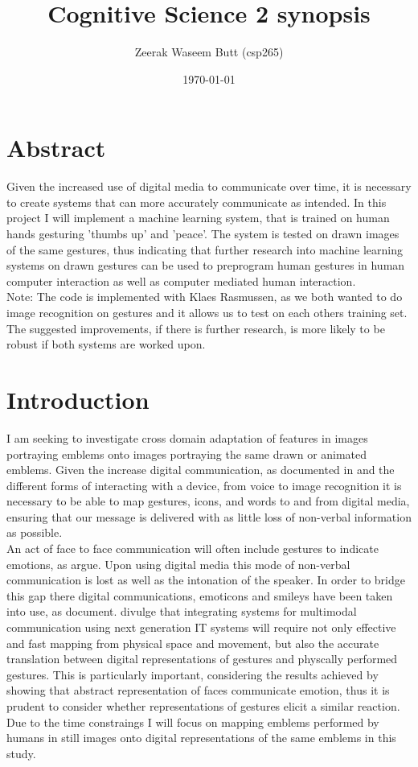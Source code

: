\documentclass[10pt, a4paper]{article}
\begin{document}
\title{Cognitive Science 2 synopsis}
\author{Zeerak Waseem Butt (csp265)}
\date{\today}
\maketitle
\section{Abstract}
Given the increased use of digital media to communicate over time, it is necessary to create systems that can more accurately communicate as intended. In this project I will implement a machine learning system, that is trained on human hands gesturing 'thumbs up' and 'peace'. The system is tested on drawn images of the same gestures, thus indicating that further research into machine learning systems on drawn gestures can be used to preprogram human gestures in human computer interaction as well as computer mediated human interaction.\\

Note: The code is implemented with Klaes Rasmussen, as we both wanted to do image recognition on gestures and it allows us to test on each others training set. The suggested improvements, if there is further research, is more likely to be robust if both systems are worked upon.
\section{Introduction}
I am seeking to investigate cross domain adaptation of features in images portraying emblems onto images portraying the same drawn or animated emblems. Given the increase digital communication, as documented in  and the different forms of interacting with a device, from voice to image recognition it is necessary to be able to map gestures, icons, and words to and from digital media, ensuring that our message is delivered with as little loss of non-verbal information as possible.\\
An act of face to face communication will often include gestures to indicate emotions, as  argue. Upon using digital media this mode of non-verbal communication is lost as well as the intonation of the speaker. In order to bridge this gap there digital communications, emoticons and smileys have been taken into use, as  document.  divulge that integrating systems for multimodal communication using next generation IT systems will require not only effective and fast mapping from physical space and movement, but also the accurate translation between digital representations of gestures and physcally performed gestures. This is particularly important, considering the results achieved by  showing that abstract representation of faces communicate emotion, thus it is prudent to consider whether representations of gestures elicit a similar reaction.\\
Due to the time constraings I will focus on mapping emblems performed by humans in still images onto digital representations of the same emblems in this study.
\end{document}
